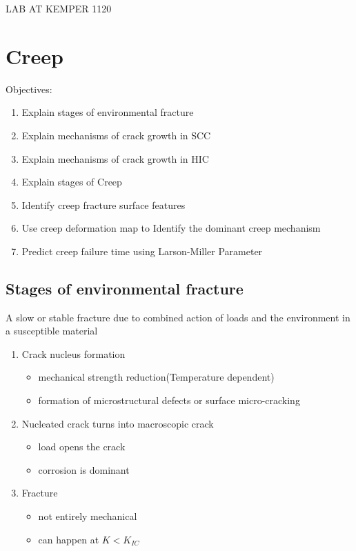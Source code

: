 \documentclass[11pt]{article}
\begin{document}
LAB AT KEMPER 1120
\tableofcontents
\section{Creep}
Objectives:
\begin{enumerate}
    \item Explain stages of environmental fracture
    \item Explain mechanisms of crack growth in SCC
    \item Explain mechanisms of crack growth in HIC
    \item Explain stages of Creep
    \item Identify creep fracture surface features
    \item Use creep deformation map to Identify the dominant creep mechanism
    \item Predict creep failure time using Larson-Miller Parameter   
\end{enumerate}
\subsection{Stages of environmental fracture}
A slow or stable fracture due to combined action of loads and the environment
in a susceptible material
\begin{enumerate}
    \item Crack nucleus formation
    \begin{itemize}
        \item mechanical strength reduction(Temperature dependent)
        \item formation of microstructural defects or surface micro-cracking
    \end{itemize}
    \item Nucleated crack turns into macroscopic crack
    \begin{itemize}
        \item load opens the crack
        \item corrosion is dominant
    \end{itemize}
    \item Fracture
    \begin{itemize}
        \item not entirely mechanical
        \item can happen at $K<K_{IC}$
    \end{itemize}
\end{enumerate}
\newpage
\end{document}

